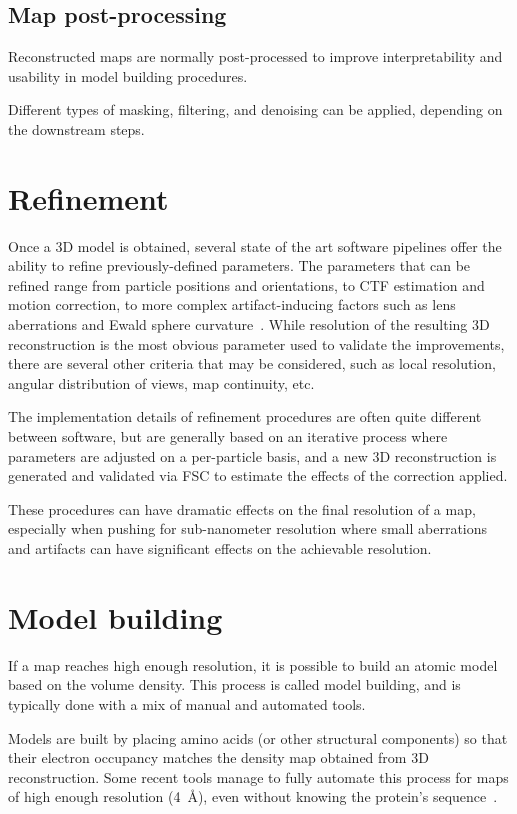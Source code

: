 \subsection{Map post-processing}
Reconstructed maps are normally post-processed to improve interpretability and usability in model building procedures.

Different types of masking, filtering, and denoising can be applied, depending on the downstream steps.


\section{Refinement}\label{em_refinement}
Once a 3D model is obtained, several state of the art software pipelines offer the ability to refine previously-defined parameters.
The parameters that can be refined range from particle positions and orientations, to CTF estimation and motion correction, to more complex artifact-inducing factors such as lens aberrations and Ewald sphere curvature~\cite{tegunovMultiparticleCryoEMRefinement2021,punjaniCryoSPARCAlgorithmsRapid2017,scheresRELIONImplementationBayesian2012}.
While resolution of the resulting 3D reconstruction is the most obvious parameter used to validate the improvements, there are several other criteria that may be considered, such as local resolution, angular distribution of views, map continuity, etc.

The implementation details of refinement procedures are often quite different between software, but are generally based on an iterative process where parameters are adjusted on a per-particle basis, and a new 3D reconstruction is generated and validated via FSC to estimate the effects of the correction applied.

These procedures can have dramatic effects on the final resolution of a map, especially when pushing for sub-nanometer resolution where small aberrations and artifacts can have significant effects on the achievable resolution.

\section{Model building}

If a map reaches high enough resolution, it is possible to build an atomic model based on the volume density.
This process is called model building, and is typically done with a mix of manual and automated tools.

Models are built by placing amino acids (or other structural components) so that their electron occupancy matches the density map obtained from 3D reconstruction.
Some recent tools manage to fully automate this process for maps of high enough resolution (\lesssim\qty{4}{\angstrom}), even without knowing the protein's sequence~\cite{jamaliAutomatedModelBuilding2024}.

